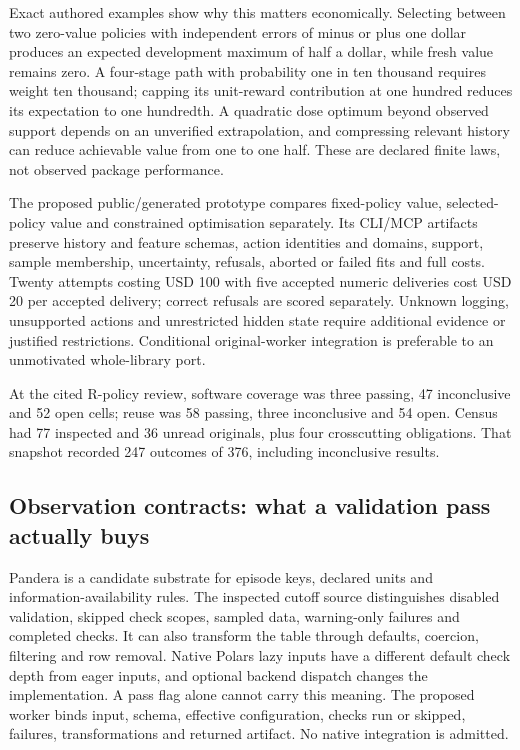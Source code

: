 Exact authored examples show why this matters economically. Selecting
between two zero-value policies with independent errors of minus or plus
one dollar produces an expected development maximum of half a dollar,
while fresh value remains zero. A four-stage path with probability one
in ten thousand requires weight ten thousand; capping its unit-reward
contribution at one hundred reduces its expectation to one hundredth. A
quadratic dose optimum beyond observed support depends on an unverified
extrapolation, and compressing relevant history can reduce achievable
value from one to one half. These are declared finite laws, not observed
package performance. \citep{exec24_policiesr_reference}

The proposed public/generated prototype compares fixed-policy value,
selected-policy value and constrained optimisation separately. Its
CLI/MCP artifacts preserve history and feature schemas, action
identities and domains, support, sample membership, uncertainty,
refusals, aborted or failed fits and full costs. Twenty attempts costing
USD 100 with five accepted numeric deliveries cost USD 20 per accepted
delivery; correct refusals are scored separately. Unknown logging,
unsupported actions and unrestricted hidden state require additional
evidence or justified restrictions. Conditional original-worker
integration is preferable to an unmotivated whole-library port.
\citep{exec24_policiesr_reference}

At the cited R-policy review, software coverage was three passing, 47
inconclusive and 52 open cells; reuse was 58 passing, three inconclusive
and 54 open. Census had 77 inspected and 36 unread originals, plus four
crosscutting obligations. That snapshot recorded 247 outcomes of 376,
including inconclusive results.
\citep{sp24policiesr_reader,sp24policiesr_progress}

\hypertarget{observation-contracts-what-a-validation-pass-actually-buys}{%
\subsection{Observation contracts: what a validation pass actually
buys}\label{observation-contracts-what-a-validation-pass-actually-buys}}

Pandera is a candidate substrate for episode keys, declared units and
information-availability rules. The inspected cutoff source
distinguishes disabled validation, skipped check scopes, sampled data,
warning-only failures and completed checks. It can also transform the
table through defaults, coercion, filtering and row removal. Native
Polars lazy inputs have a different default check depth from eager
inputs, and optional backend dispatch changes the implementation. A pass
flag alone cannot carry this meaning. The proposed worker binds input,
schema, effective configuration, checks run or skipped, failures,
transformations and returned artifact. No native integration is
admitted. \citep{exec24_pandera_source}


